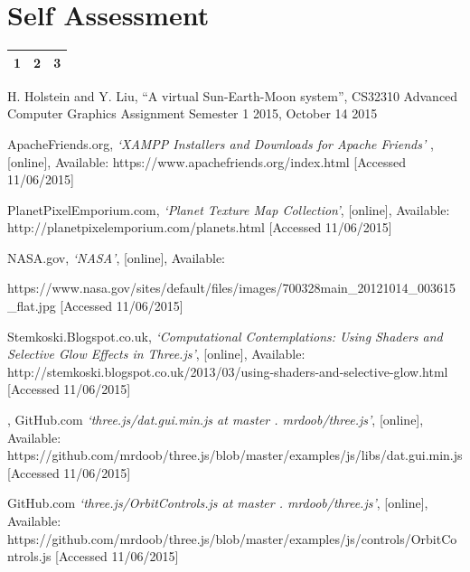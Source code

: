 \documentclass[12pt]{article}
\begin{document}
\section{Self Assessment}
\begin{tabular}{ | l | c | r |}
\hline	
 1 & 2 & 3 \\
 \hline	
\end{tabular}


\clearpage


\begin{thebibliography}{5}

 H. Holstein and Y. Liu, ``A virtual Sun-Earth-Moon system'', CS32310 Advanced Computer Graphics Assignment Semester 1 2015, October 14 2015

 ApacheFriends.org, {\em `XAMPP Installers and Downloads for Apache Friends' }, [online], 
Available: https://www.apachefriends.org/index.html [Accessed 11/06/2015]

 PlanetPixelEmporium.com, {\em `Planet Texture Map Collection'}, [online],
Available: http://planetpixelemporium.com/planets.html [Accessed 11/06/2015]

 NASA.gov, {\em `NASA'}, [online], Available: 

https://www.nasa.gov/sites/default/files/images/700328main\_20121014\_003615\_flat.jpg [Accessed 11/06/2015]

 Stemkoski.Blogspot.co.uk, {\em `Computational Contemplations: Using Shaders and Selective Glow Effects in Three.js'}, [online],
Available: http://stemkoski.blogspot.co.uk/2013/03/using-shaders-and-selective-glow.html [Accessed 11/06/2015]

, GitHub.com {\em `three.js/dat.gui.min.js at master . mrdoob/three.js'}, [online],
Available: https://github.com/mrdoob/three.js/blob/master/examples/js/libs/dat.gui.min.js [Accessed 11/06/2015]

 GitHub.com {\em `three.js/OrbitControls.js at master . mrdoob/three.js'}, [online],
Available: https://github.com/mrdoob/three.js/blob/master/examples/js/controls/OrbitControls.js [Accessed 11/06/2015]


\end{thebibliography}
\end{document}
